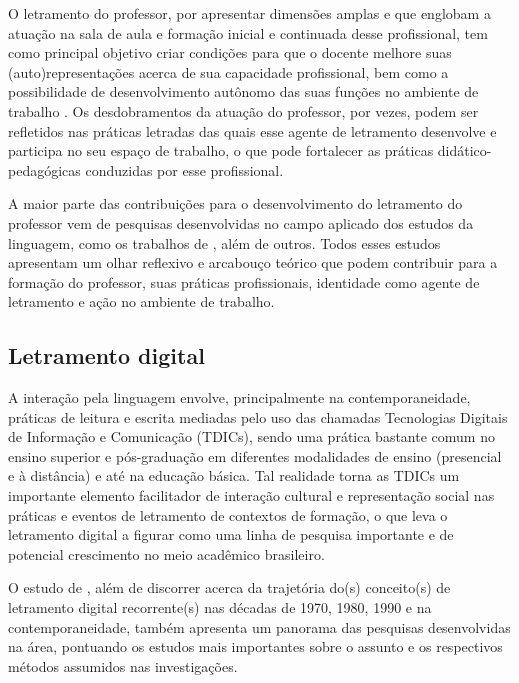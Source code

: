 \documentclass{textolivre}
\begin{document}
O letramento do professor, por apresentar dimensões amplas e que englobam a atuação na sala de aula e formação inicial e continuada desse profissional, tem como principal objetivo criar condições para que o docente melhore suas (auto)representações acerca de sua capacidade profissional, bem como a possibilidade de desenvolvimento autônomo das suas funções no ambiente de trabalho \cite{kleiman_projetos_2009}. Os desdobramentos da atuação do professor, por vezes, podem ser refletidos nas práticas letradas das quais esse agente de letramento desenvolve e participa no seu espaço de trabalho, o que pode fortalecer as práticas didático-pedagógicas conduzidas por esse profissional.

A maior parte das contribuições para o desenvolvimento do letramento do professor vem de pesquisas desenvolvidas no campo aplicado dos estudos da linguagem, como os trabalhos de \textcite{kleiman_processos_2006, kleiman_projetos_2009, oliveira_variacao_2010, kleiman_estudos_2014}, além de outros. Todos esses estudos apresentam um olhar reflexivo e arcabouço teórico que podem contribuir para a formação do professor, suas práticas profissionais, identidade como agente de letramento \cite{kleiman_processos_2006, kleiman_projetos_2009} e ação no ambiente de trabalho.

\subsection{Letramento digital}\label{sec-digital}
A interação pela linguagem envolve, principalmente na contemporaneidade, práticas de leitura e escrita mediadas pelo uso das chamadas Tecnologias Digitais de Informação e Comunicação (TDICs), sendo uma prática bastante comum no ensino superior e pós-graduação em diferentes modalidades de ensino (presencial e à distância) e até na educação básica. Tal realidade torna as TDICs um importante elemento facilitador de interação cultural e representação social nas práticas e eventos de letramento de contextos de formação, o que leva o letramento digital a figurar como uma linha de pesquisa importante e de potencial crescimento no meio acadêmico brasileiro.

O estudo de \textcite{araujo_letramento_2014}, além de discorrer acerca da trajetória do(s) conceito(s) de letramento digital recorrente(s) nas décadas de 1970, 1980, 1990 e na contemporaneidade, também apresenta um panorama das pesquisas desenvolvidas na área, pontuando os estudos mais importantes sobre o assunto e os respectivos métodos assumidos nas investigações.
\end{document}
